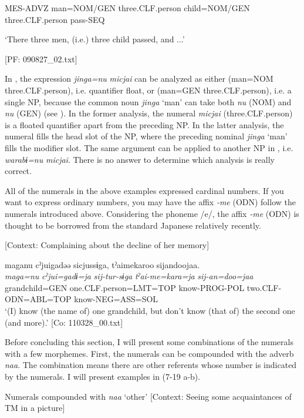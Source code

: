     MES-ADVZ  man=NOM/GEN  three.CLF.person  child=NOM/GEN   three.CLF.person  pass-SEQ

    ‘There three men, (i.e.) three child passed, and ...’

    [PF: 090827\_02.txt]
\z

In , the expression \textit{jinga=nu} \textit{micjai} can be analyzed as either (man=NOM three.CLF.person), i.e. quantifier float, or (man=GEN three.CLF.person), i.e. a single NP, because the common noun \textit{jinga} ‘man’ can take both \textit{nu} (NOM) and \textit{nu} (GEN) (see ). In the former analysis, the numeral \textit{micjai} (three.CLF.person) is a floated quantifier apart from the preceding NP. In the latter analysis, the numeral fills the head slot of the NP, where the preceding nominal \textit{jinga} ‘man’ fills the modifier slot. The same argument can be applied to another NP in , i.e. \textit{warabɨ=nu} \textit{micjai}. There is no answer to determine which analysis is really correct.

  All of the numerals in the above examples expressed cardinal numbers. If you want to express ordinary numbers, you may have the affix \textit{{}-me} (ODN) follow the numerals introduced above. Considering the phoneme /e/, the affix \textit{{}-me} (ODN) is thought to be borrowed from the standard Japanese relatively recently.

\ea \label{ex:7:18}  [Context: Complaining about the decline of her memory]

\glll  maganu  cˀjuigadəə  sicjussɨga,   tˀaimekaroo  sijandoojaa.\\
\textit{maga=nu}  \textit{cˀjui=gadɨ=ja}  \textit{sij-tur-sɨga}  \textit{tˀai-me=kara=ja}  \textit{sij-an=doo=jaa}\\
grandchild=GEN  one.CLF.person=LMT=TOP  know-PROG-POL            two.CLF-ODN=ABL=TOP  know-NEG=ASS=SOL\\
\glt ‘(I) know (the name of) one grandchild, but don’t know (that of) the second one (and more).’ [Co: 110328\_00.txt]
\z

Before concluding this section, I will present some combinations of the numerals with a few morphemes. First, the numerals can be compounded with the adverb \textit{naa}. The combination means there are other referents whose number is indicated by the numerals. I will present examples in (7-19 a-b).

\ea \label{ex:7:19}  Numerals compounded with \textit{naa} ‘other’
\ea \label{ex:7:19a}[Context: Seeing some acquaintances of TM in a picture]

